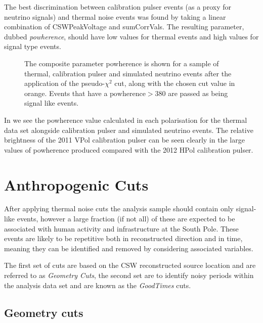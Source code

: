 The best discrimination between calibration pulser events (as a proxy for neutrino signals) and thermal noise events was found by taking a linear combination of CSWPeakVoltage and sumCorrVals. The resulting parameter, dubbed \textit{powherence}, should have low values for thermal events and high values for signal type events.


\begin{figure}[htpb]
  \hfill
  \caption{The composite parameter powherence is shown for a sample of thermal, calibration pulser and simulated neutrino events after the application of the pseudo-$\chi^{2}$ cut, along with the chosen cut value in orange. Events that have a $\mbox{powherence} > 380$ are passed as being signal like events.}
  \label{fig:Analysis:Thermal-Cuts:Powherence}
\end{figure}

In  we see the powherence value calculated in each polarisation for the thermal data set alongside calibration pulser and simulated neutrino events. The relative brightness of the 2011 VPol calibration pulser can be seen clearly in the large values of powherence produced compared with the 2012 HPol calibration pulser.


\section{Anthropogenic Cuts}
\label{sec:Analysis:Anthropogenic-Cuts}

After applying thermal noise cuts the analysis sample should contain only signal-like events, however a large fraction (if not all) of these are expected to be associated with human activity and infrastructure at the South Pole. These events are likely to be repetitive both in reconstructed direction and in time, meaning they can be identified and removed by considering associated variables.

The first set of cuts are based on the CSW reconstructed source location and are referred to as \textit{Geometry Cuts}, the second set are to identify noisy periods within the analysis data set and are known as the \textit{GoodTimes} cuts.

\subsection{Geometry cuts}
\label{sec:Analysis:Anthropogenic-Cuts:Geometry-Cuts}

